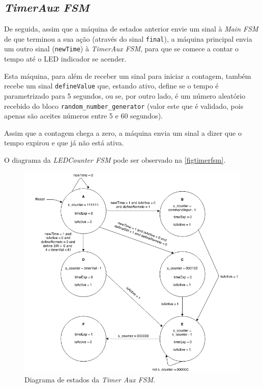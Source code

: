 \documentclass[a4paper,11pt,onecolumn]{report}
\begin{document}
\subsection{\textit{TimerAux FSM}}

De seguida, assim que a máquina de estados anterior envie um sinal à \textit{Main FSM} de que terminou a sua ação (através do sinal \texttt{final}), a máquina principal envia um outro sinal (\texttt{newTime}) à \textit{TimerAux FSM}, para que se comece a contar o tempo até o LED indicador se acender.

Esta máquina, para além de receber um sinal para iniciar a contagem, também recebe um sinal \texttt{defineValue} que, estando ativo, define se o tempo é parametrizado para 5 segundos, ou se, por outro lado, é um número aleatório recebido do bloco \texttt{random\_number\_generator} (valor este que é validado, pois apenas são aceites números entre 5 e 60 segundos).

Assim que a contagem chega a zero, a máquina envia um sinal a dizer que o tempo expirou e que já não está ativa.

O diagrama da \textit{LEDCounter FSM} pode ser observado na \autoref{figtimerfsm}.

\begin{figure}[h]
\centerline{\includegraphics[scale=0.33]{Images/TimerAuxFSMDiagram}}
\caption{Diagrama de estados da \textit{Timer Aux FSM}.}
\label{figtimerfsm}
\end{figure}
\end{document}

